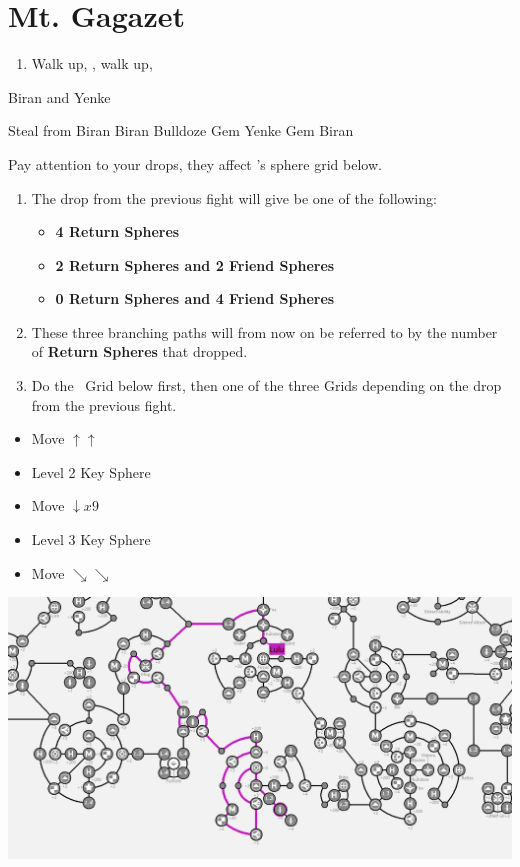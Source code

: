 \chapter{Mt. Gagazet}
\begin{enumerate}
    \item Walk up, \cs[3:40], walk up, \sd
\end{enumerate}
\begin{battle}{Biran and Yenke}
    \begin{itemize}
        \kimahrif Steal from Biran
        \enemyf Biran Bulldoze
        \kimahrif Gem Yenke
        \kimahrif Gem Biran
    \end{itemize}
    Pay attention to your drops, they affect \yuna's sphere grid below.
\end{battle}
\begin{enumerate}[resume]
    \item The drop from the previous fight will give be one of the following:
    \begin{itemize}
        \item \textbf{4 Return Spheres}
        \item \textbf{2 Return Spheres and 2 Friend Spheres}
        \item \textbf{0 Return Spheres and 4 Friend Spheres}
    \end{itemize}
    \item These three branching paths will from now on be referred to by the number of \textbf{Return Spheres} that dropped.
    \item Do the \lulu\ Grid below first, then one of the three Grids depending on the drop from the previous fight.
\end{enumerate}
\begin{spheregrid}[Lulu]
    \begin{itemize}
        \luluf
        \begin{itemize}
            \item Move $\uparrow\uparrow$
            \item Level 2 Key Sphere
            \item Move $\downarrow x9$
            \item Level 3 Key Sphere
            \item Move $\searrow\searrow$
        \end{itemize}
        \includegraphics[width=.25\columnwidth]{graphics/lulu_grid}
    \end{itemize}
\end{spheregrid}

